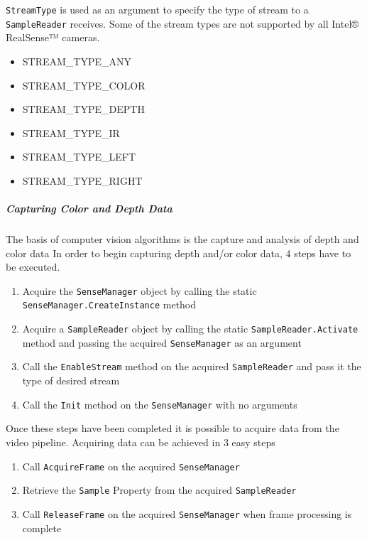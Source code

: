 \documentclass[12pt]{article}
\providecommand{\tightlist}{%
  \setlength{\itemsep}{0pt}\setlength{\parskip}{0pt}}
\begin{document}
\texttt{StreamType} is used as an argument to specify the type of stream
to a \texttt{SampleReader} receives. Some of the stream types are not
supported by all Intel® RealSense™ cameras.

\begin{itemize}
\tightlist
\item
  STREAM\_TYPE\_ANY
\item
  STREAM\_TYPE\_COLOR
\item
  STREAM\_TYPE\_DEPTH
\item
  STREAM\_TYPE\_IR
\item
  STREAM\_TYPE\_LEFT
\item
  STREAM\_TYPE\_RIGHT
\end{itemize}

\subparagraph{Capturing Color and Depth
Data}\label{capturing-color-and-depth-data}

The basis of computer vision algorithms is the capture and analysis of
depth and color data In order to begin capturing depth and/or color
data, 4 steps have to be executed.

\begin{enumerate}
\def\labelenumi{\arabic{enumi}.}
\tightlist
\item
  Acquire the \texttt{SenseManager} object by calling the static
  \texttt{SenseManager.CreateInstance} method
\item
  Acquire a \texttt{SampleReader} object by calling the static
  \texttt{SampleReader.Activate} method and passing the acquired
  \texttt{SenseManager} as an argument
\item
  Call the \texttt{EnableStream} method on the acquired
  \texttt{SampleReader} and pass it the type of desired stream
\item
  Call the \texttt{Init} method on the \texttt{SenseManager} with no
  arguments
\end{enumerate}

Once these steps have been completed it is possible to acquire data from
the video pipeline. Acquiring data can be achieved in 3 easy steps

\begin{enumerate}
\def\labelenumi{\arabic{enumi}.}
\tightlist
\item
  Call \texttt{AcquireFrame} on the acquired \texttt{SenseManager}
\item
  Retrieve the \texttt{Sample} Property from the acquired
  \texttt{SampleReader}
\item
  Call \texttt{ReleaseFrame} on the acquired \texttt{SenseManager} when
  frame processing is complete
\end{enumerate}
\end{document}
